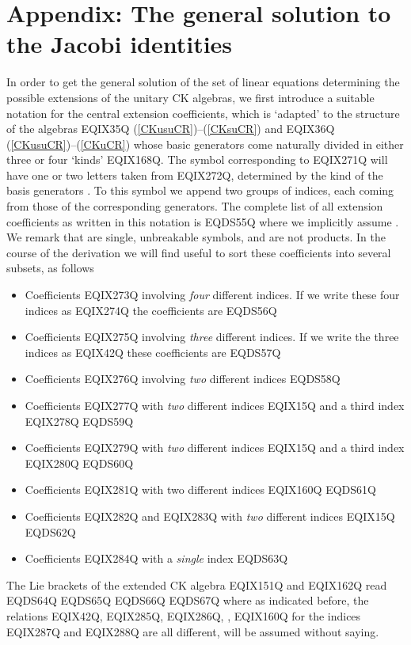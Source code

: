 \section*{Appendix: The general solution to the Jacobi identities}
\setcounter{equation}{0}

In order to get the general solution of the set of linear equations
determining the possible extensions of the  unitary CK
algebras, we first introduce a suitable notation for the central
extension coefficients, which is `adapted' to the structure of the
algebras EQIX35Q  (\ref{CKusuCR})--(\ref{CKsuCR})  and
EQIX36Q (\ref{CKusuCR})--(\ref{CKuCR})
whose basic generators come  naturally divided in either three
or four `kinds' EQIX168Q. The symbol
corresponding to EQIX271Q will have one or two letters taken
from EQIX272Q, determined by the kind of the basis generators . To this symbol we append two groups of indices, each coming from
those of the corresponding generators.  The complete list of all
extension coefficients as written in this notation is
EQDS55Q
where we implicitly assume . We remark that  are single, unbreakable symbols, and are not products. In the
course of the derivation we will find useful to sort these
coefficients into several subsets, as follows

\begin{itemize}
\item Coefficients
EQIX273Q
involving \emph{four} different indices. If we write these four indices
as EQIX274Q the coefficients are
EQDS56Q
\item Coefficients
EQIX275Q involving
\emph{three} different indices. If we write the three indices as
EQIX42Q these coefficients are
EQDS57Q
\item Coefficients EQIX276Q
involving \emph{two} different indices
EQDS58Q
\item Coefficients EQIX277Q with \emph{two}
different indices EQIX15Q and a third index EQIX278Q
EQDS59Q
\item Coefficients EQIX279Q with \emph{two}
different indices EQIX15Q and a third index EQIX280Q
EQDS60Q
\item Coefficients EQIX281Q with two different indices EQIX160Q
EQDS61Q
\item Coefficients EQIX282Q and EQIX283Q with \emph{two}
different indices EQIX15Q
EQDS62Q
\item Coefficients EQIX284Q with a \emph{single} index
EQDS63Q
\end{itemize}
The Lie brackets of the extended CK algebra
EQIX151Q  and
EQIX162Q   read
EQDS64Q
EQDS65Q
EQDS66Q
EQDS67Q
where as indicated before, the relations EQIX42Q, EQIX285Q, EQIX286Q,   ,
EQIX160Q for the indices EQIX287Q
and EQIX288Q are all different, will be assumed without saying.

